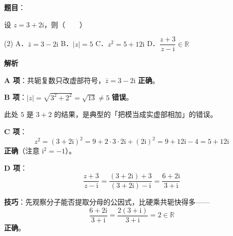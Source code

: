 \begin{answer}

\textbf{题目}：

设 $z=3+2\mathrm{i}$，则\mbox{（　　）}

\begin{gkopts}(2)
\task A．$\bar{z}=3-2\mathrm{i}$
\task B．$|z|=5$
\task C．$z^2=5+12\mathrm{i}$
\task D．$\dfrac{z+3}{z-\mathrm{i}}\in\mathbb{R}$
\end{gkopts}

\textbf{解析}

\textbf{A 项}：共轭复数只改虚部符号，$\bar z=3-2\mathrm{i}$  \textbf{正确}。

\textbf{B 项}：$|z|=\sqrt{3^2+2^2}=\sqrt{13}\ne 5$  \textbf{错误}。

\begin{gktip}
此处 $5$ 是 $3+2$ 的结果，是典型的「把模当成实虚部相加」的错误。
\end{gktip}

\textbf{C 项}：
\nopagebreak[4]
\[z^2=(3+2\mathrm{i})^2=9+2\cdot3\cdot2\mathrm{i}+(2\mathrm{i})^2=9+12\mathrm{i}-4=5+12\mathrm{i}\]
 \textbf{正确}（注意 $\mathrm{i}^2=-1$）。

\textbf{D 项}：
\nopagebreak[4]
\[\frac{z+3}{z-\mathrm{i}}=\frac{(3+2\mathrm{i})+3}{(3+2\mathrm{i})-\mathrm{i}}=\frac{6+2\mathrm{i}}{3+\mathrm{i}}\]

\textbf{技巧}：先观察分子能否提取分母的公因式，比硬乘共轭快得多——
\nopagebreak[4]
\[\frac{6+2\mathrm{i}}{3+\mathrm{i}}=\frac{2(3+\mathrm{i})}{3+\mathrm{i}}=2\in\mathbb{R}\]
 \textbf{正确}。


\par\medskip

\end{answer}
